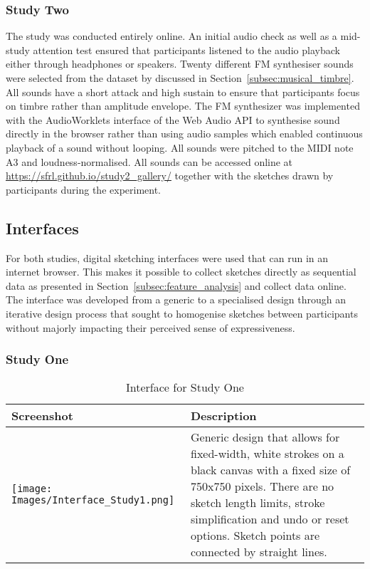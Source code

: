 \documentclass[]{interact}
\theoremstyle{plain}%
\theoremstyle{definition}
\theoremstyle{remark}
\begin{document}
\subsubsection{Study Two}\label{subsubsec:material_two}
The study was conducted entirely online. An initial audio check as well as a mid-study attention test ensured that participants listened to the audio playback either through headphones or speakers. Twenty different FM synthesiser sounds were selected from the dataset by  discussed in Section~\ref{subsec:musical_timbre}. All sounds have a short attack and high sustain to ensure that participants focus on timbre rather than amplitude envelope. The FM synthesizer was implemented with the AudioWorklets interface of the Web Audio API to synthesise sound directly in the browser rather than using audio samples which enabled continuous playback of a sound without looping. All sounds were pitched to the MIDI note A3 and loudness-normalised. All sounds can be accessed online at \url{https://sfrl.github.io/study2_gallery/} together with the sketches drawn by participants during the experiment.

\subsection{Interfaces}\label{subsec:interfaces}
For both studies, digital sketching interfaces were used that can run in an internet browser. This makes it possible to collect sketches directly as sequential data as presented in Section~\ref{subsec:feature_analysis} and collect data online. The interface was developed from a generic to a specialised design through an iterative design process that sought to homogenise sketches between participants without majorly impacting their perceived sense of expressiveness. 

\subsubsection{Study One}\label{subsubsec:interface_one}

\begin{table*}[h!]
 \begin{center}
 \begin{tabular}{|p{0.5\linewidth}|p{0.5\linewidth}|}
\hline
    \textbf{Screenshot}
        & 
    \textbf{Description}   
    \\
\hline
\vspace{0cm}
    \texttt{[image: Images/Interface\_Study1.png]}

    & 
    Generic design that allows for fixed-width, white strokes on a black canvas with a fixed size of 750x750 pixels. There are no sketch length limits, stroke simplification and undo or reset options. Sketch points are connected by straight lines.
   
    \\
 \hline
\end{tabular}
\end{center}
\vspace*{-0.05in}
 \caption{Interface for Study One}
 \label{tab:interface_1_specs}
\end{table*}
\end{document}
